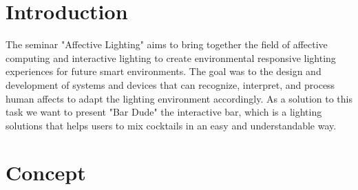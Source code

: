 \documentclass{acm_proc_article-sp}
\begin{document}
\maketitle
\begin{abstract}
%
%
\end{abstract}




\section{Introduction}
The seminar "Affective Lighting" aims to bring together the field of affective computing and interactive lighting to create environmental responsive lighting experiences for future smart environments. The goal was to the design and development of systems and devices that can recognize, interpret, and process human affects to adapt the lighting environment accordingly. As a solution to this task we want to present "Bar Dude"  the interactive bar, which is a lighting solutions that helps users to mix cocktails in an easy and understandable way.

\section{Concept}
\end{document}
